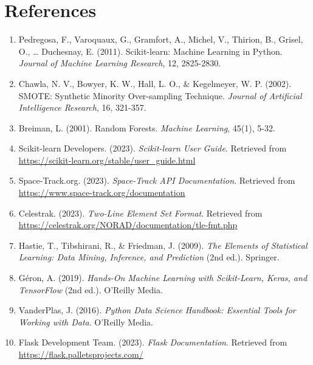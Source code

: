 \documentclass[12pt,a4paper]{article}
\begin{document}
\section{References}

\begin{enumerate}
    \item Pedregosa, F., Varoquaux, G., Gramfort, A., Michel, V., Thirion, B., Grisel, O., \ldots{} Duchesnay, E. (2011). Scikit-learn: Machine Learning in Python. \textit{Journal of Machine Learning Research}, 12, 2825-2830.
    
    \item Chawla, N. V., Bowyer, K. W., Hall, L. O., \& Kegelmeyer, W. P. (2002). SMOTE: Synthetic Minority Over-sampling Technique. \textit{Journal of Artificial Intelligence Research}, 16, 321-357.
    
    \item Breiman, L. (2001). Random Forests. \textit{Machine Learning}, 45(1), 5-32.
    
    \item Scikit-learn Developers. (2023). \textit{Scikit-learn User Guide}. Retrieved from \url{https://scikit-learn.org/stable/user_guide.html}
    
    \item Space-Track.org. (2023). \textit{Space-Track API Documentation}. Retrieved from \url{https://www.space-track.org/documentation}
    
    \item Celestrak. (2023). \textit{Two-Line Element Set Format}. Retrieved from \url{https://celestrak.org/NORAD/documentation/tle-fmt.php}
    
    \item Hastie, T., Tibshirani, R., \& Friedman, J. (2009). \textit{The Elements of Statistical Learning: Data Mining, Inference, and Prediction} (2nd ed.). Springer.
    
    \item Géron, A. (2019). \textit{Hands-On Machine Learning with Scikit-Learn, Keras, and TensorFlow} (2nd ed.). O'Reilly Media.
    
    \item VanderPlas, J. (2016). \textit{Python Data Science Handbook: Essential Tools for Working with Data}. O'Reilly Media.
    
    \item Flask Development Team. (2023). \textit{Flask Documentation}. Retrieved from \url{https://flask.palletsprojects.com/}
    

\end{enumerate}
\end{document}
